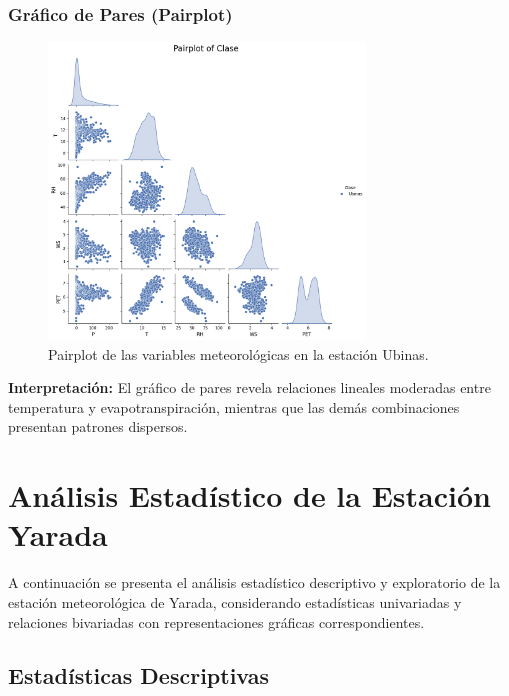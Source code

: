\subsubsection*{Gráfico de Pares (Pairplot)}
\begin{figure}[htbp]
\centering
\includegraphics[width=0.75\textwidth]{resultados/por_estacion_meteorologica/Ubinas/pairplot.png}
\caption{Pairplot de las variables meteorológicas en la estación Ubinas.}
\label{fig:ubinas_pairplot}
\end{figure}
\textbf{Interpretación:} El gráfico de pares revela relaciones lineales moderadas entre temperatura y evapotranspiración, mientras que las demás combinaciones presentan patrones dispersos.


\section{Análisis Estadístico de la Estación Yarada}

A continuación se presenta el análisis estadístico descriptivo y exploratorio de la estación meteorológica de Yarada, considerando estadísticas univariadas y relaciones bivariadas con representaciones gráficas correspondientes.

\subsection{Estadísticas Descriptivas}


